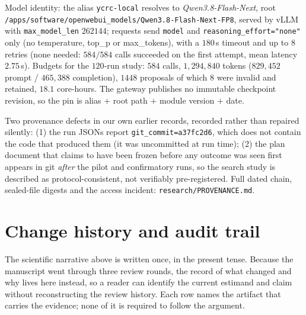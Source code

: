 \documentclass{neurips_2024}
\newcommand{\MODEL}{\textit{Qwen3.8-Flash-Next}}
\begin{document}
Model identity: the alias \texttt{ycrc-local} resolves to \MODEL{}, root
\texttt{/apps/software/\allowbreak openwebui\_models/\allowbreak Qwen3.8-Flash-Next-FP8},
served by vLLM with
\texttt{max\_model\_len} $262144$; requests send \texttt{model} and
\texttt{reasoning\_effort="none"} only (no temperature, top\_p or max\_tokens), with a
$180$\,s timeout and up to $8$ retries (none needed: $584/584$ calls succeeded on the first
attempt, mean latency $2.75$\,s). Budgets for the $120$-run study: $584$ calls,
$1{,}294{,}840$ tokens ($829{,}452$ prompt / $465{,}388$ completion), $1448$ proposals of
which $8$ were invalid and retained, $18.1$ core-hours. The gateway publishes no immutable
checkpoint revision, so the pin is alias $+$ root path $+$ module version $+$ date.

Two provenance defects in our own earlier records, recorded rather than repaired
silently: (1) the run JSONs report \texttt{git\_commit=a37fc2d6}, which does not contain
the code that produced them (it was uncommitted at run time); (2) the plan document that
claims to have been frozen before any outcome was seen first appears in git
\emph{after} the pilot and confirmatory runs, so the search study is described as
protocol-consistent, not verifiably pre-registered. Full dated chain, sealed-file digests
and the access incident: \texttt{research/PROVENANCE.md}.
\section{Change history and audit trail}
\label{app:audit}

The scientific narrative above is written once, in the present tense. Because the manuscript
went through three review rounds, the record of what changed and why lives here instead, so a
reader can identify the current estimand and claim without reconstructing the review history.
Each row names the artifact that carries the evidence; none of it is required to follow the
argument.
\end{document}
